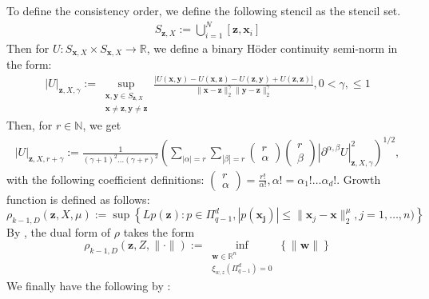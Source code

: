 \documentclass[11pt]{article}
\begin{document}
To define the consistency order, we define the following stencil as the stencil set.
\begin{align*}
	S_{\bm{z},X} := \bigcup_{i=1}^N[\bm{z}, \bm{x}_i]
\end{align*}
Then for $U: S_{\bm{x},X} \times S_{\bm{x},X} \rightarrow \mathbb{R}$, we define a binary H\"{o}der continuity semi-norm in the form:
\begin{align*}
	|U|_{\bm{z},X,\gamma}:=\sup_{\substack{\bm{x},\bm{y}\in S_{\bm{z},X} \\ \bm{x} \neq \bm{z}, \bm{y} \neq \bm{z}}} \frac{\left| U(\bm{x},\bm{y}) - U(\bm{x},\bm{z}) - U(\bm{z},\bm{y}) + U(\bm{z},\bm{z}) \right|}{\| \bm{x} - \bm{z}\|_2^\gamma \| \bm{y} - \bm{z} \|_2^\gamma} , 0 < \gamma, \le 1
\end{align*}
Then, for $r \in \mathbb{N}$, we get
\begin{align*}
	|U|_{\bm{z},X,r+\gamma}:=\frac{1}{(\gamma+1)^2\hdots (\gamma+r)^2} \left( \sum_{|\alpha|=r} \sum_{|\beta|=r} \begin{pmatrix}	r \\ \alpha \end{pmatrix}
\begin{pmatrix}	r \\ \beta \end{pmatrix} |\partial^{\alpha,\beta}U|_{\bm{z},X,\gamma}^2	 \right)^{1/2},
\end{align*}
with the following coefficient definitions: $\begin{pmatrix}	r \\ \alpha \end{pmatrix} = \frac{r!}{\alpha!}, \alpha!=\alpha_1! \hdots \alpha_d!$.
Growth function is defined as follows:
\begin{equation}
	\rho_{k-1,D}(\bm{z},X,\mu) := \sup \left \{ Lp(\bm{z}): p\in \Pi_{q-1}^d, | p(\bm{x_j}) | \le \| \bm{x}_j - \bm{x} \|_2^\mu, j=1,\hdots,n) \right \}
\end{equation}
By \cite{Davydov2018}, the dual form of $\rho$ takes the form
\begin{equation*}
	\rho_{k-1,D}(\bm{z},Z,\| \cdot \|) := \inf_{\substack{\bm{w} \in \mathbb{R}^n \\ \xi_{w,z} \left(\Pi_{q-1}^d \right) = 0}}{\left \{ \| \bm{w} \|  \right \}}
\end{equation*}
We finally have the following by \cite{Davydov2025}:
\end{document}
